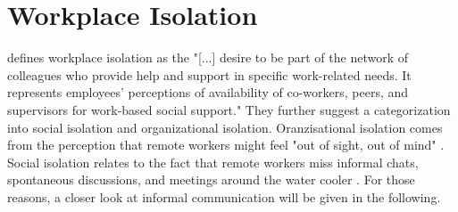 \section{Workplace Isolation}
\textcite{marshall2007workplace} defines workplace isolation as the "[...] desire to be part of the network of colleagues who provide help and support in specific work-related needs. It represents employees' perceptions of availability of co-workers, peers, and supervisors for work-based social support." They further suggest a categorization into social isolation and organizational isolation. Oranzisational isolation comes from the perception that remote workers might feel "out of sight, out of mind" \autocite{bailey1999advantages}. Social isolation relates to the fact that remote workers miss informal chats, spontaneous discussions, and meetings around the water cooler \autocite{cooper2002telecommuting}. For those reasons, a closer look at informal communication will be given in the following.

